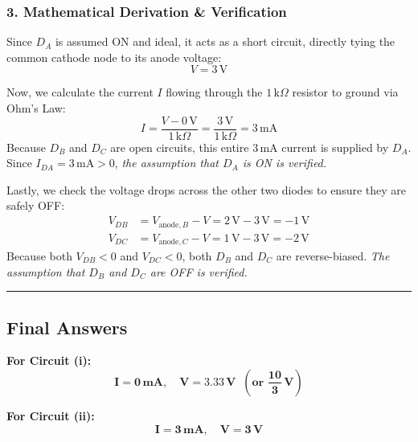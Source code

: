 \documentclass[12pt,a3paper]{article}
\begin{document}
\begin{enumerate}
\begin{tcolorbox}[enhanced,breakable,ansbox,colback=cA!4,colframe=cA,boxrule=0.8pt,arc=5pt,title={\textbf{Answer}},fonttitle=\bfseries\color{white},colbacktitle=cA]
\subsubsection*{3. Mathematical Derivation \& Verification}
Since $D_A$ is assumed ON and ideal, it acts as a short circuit, directly tying the common cathode node to its anode voltage:
\begin{equation}
    V = 3\,\text{V}
\end{equation}

Now, we calculate the current $I$ flowing through the $1\,\text{k}\Omega$ resistor to ground via Ohm's Law:
\begin{equation}
    I = \frac{V - 0\,\text{V}}{1\,\text{k}\Omega} = \frac{3\,\text{V}}{1\,\text{k}\Omega} = 3\,\text{mA}
\end{equation}
Because $D_B$ and $D_C$ are open circuits, this entire $3\,\text{mA}$ current is supplied by $D_A$. Since $I_{DA} = 3\,\text{mA} > 0$, \textit{the assumption that $D_A$ is ON is verified.}

Lastly, we check the voltage drops across the other two diodes to ensure they are safely OFF:
\begin{align}
    V_{DB} &= V_{\text{anode}, B} - V = 2\,\text{V} - 3\,\text{V} = -1\,\text{V} \\
    V_{DC} &= V_{\text{anode}, C} - V = 1\,\text{V} - 3\,\text{V} = -2\,\text{V}
\end{align}
Because both $V_{DB} < 0$ and $V_{DC} < 0$, both $D_B$ and $D_C$ are reverse-biased. \textit{The assumption that $D_B$ and $D_C$ are OFF is verified.}

\vspace{0.5cm}
\hrule
\vspace{0.5cm}

\subsection*{Final Answers}

\textbf{For Circuit (i):}
\begin{equation}
    \mathbf{I = 0\,\text{mA}}, \quad \mathbf{V = 3.33\,\text{V} \;\; \left(\text{or } \frac{10}{3}\,\text{V}\right)}
\end{equation}

\textbf{For Circuit (ii):}
\begin{equation}
    \mathbf{I = 3\,\text{mA}}, \quad \mathbf{V = 3\,\text{V}}
\end{equation}

\end{tcolorbox}

\end{enumerate}
\end{document}
